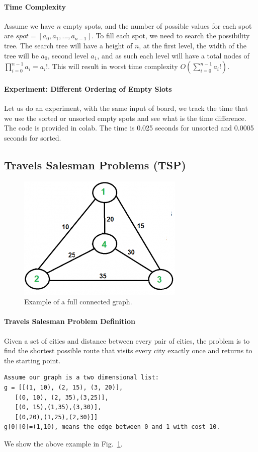 \documentclass[../main.tex]{subfiles}
\begin{document}
\paragraph{Time Complexity} Assume we have $n$ empty spots, and the number of possible values for each spot are $spot=[a_0, a_1, ..., a_{n-1}]$. To fill each spot, we need to search the possibility tree. The search tree will have a height of $n$, at the first level, the width of the tree will be $a_0$, second level $a_1$, and as such each level will have a total nodes of $\prod_{i=0}^{n-1} a_i=a_i!$. This will result in worst time complexity $O(\sum_{i=0}^{n-1} a_i!)$. 

\paragraph{Experiment: Different Ordering of Empty Slots} Let us do an experiment, with the same input of board, we track the time that we use the sorted or unsorted empty spots and see what is the time difference. The code is provided in colab.  The time is 0.025 seconds for unsorted and 0.0005 seconds for sorted. 

\subsection{Travels Salesman Problems (TSP)}
\begin{figure}[!ht]
    \centering
    \includegraphics[width= 0.5\columnwidth]{fig/Euler12-300x225.png}
    \caption{Example of a full connected graph.}
    \label{fig:tsp_graph}
\end{figure}
\paragraph{Travels Salesman Problem Definition} Given a set of cities and distance between every pair of cities, the problem is to find the shortest possible route that visits every city exactly once and returns to the starting point.
\begin{lstlisting}[numbers=none]
Assume our graph is a two dimensional list:
g = [[(1, 10), (2, 15), (3, 20)], 
   [(0, 10), (2, 35),(3,25)],
   [(0, 15),(1,35),(3,30)],
   [(0,20),(1,25),(2,30)]]
g[0][0]=(1,10), means the edge between 0 and 1 with cost 10.
\end{lstlisting}
We show the above example in Fig.~\ref{fig:tsp_graph}.
\end{document}
